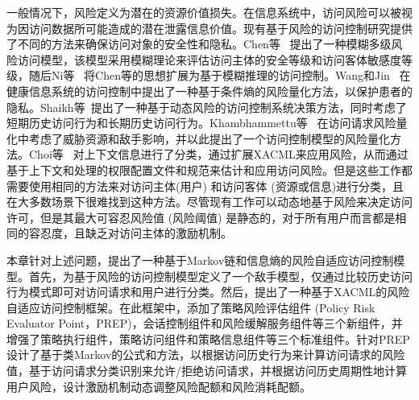 一般情况下，风险定义为潜在的资源价值损失。在信息系统中，访问风险可以被视为因访问数据所可能造成的潜在泄露信息价值。现有基于风险的访问控制研究提供了不同的方法来确保访问对象的安全性和隐私。Chen等~\cite{cheng2007fuzzy} 提出了一种模糊多级风险访问模型，该模型采用模糊理论来评估访问主体的安全等级和访问客体敏感度等级，随后Ni等~\cite{ni2010risk} 将Chen等的思想扩展为基于模糊推理的访问控制。Wang和Jin~\cite{wang2011quantified} 在健康信息系统的访问控制中提出了一种基于条件熵的风险量化方法，以保护患者的隐私。Shaikh等~\cite{shaikh2012dynamic}提出了一种基于动态风险的访问控制系统决策方法，同时考虑了短期历史访问行为和长期历史访问行为。Khambhammettu等~\cite{khambhammettu2013framework} 在访问请求风险量化中考虑了威胁资源和敌手影响，并以此提出了一个访问控制模型的风险量化方法。Choi等~\cite{choi2015framework} 对上下文信息进行了分类，通过扩展XACML来应用风险，从而通过基于上下文和处理的权限配置文件和规范来估计和应用访问风险。但是这些工作都需要使用相同的方法来对访问主体(用户) 和访问客体 (资源或信息)进行分类，且在大多数场景下很难找到这种方法。尽管现有工作可以动态地基于风险来决定访问许可，但是其最大可容忍风险值 (风险阈值) 是静态的，对于所有用户而言都是相同的容忍度，且缺乏对访问主体的激励机制。

本章针对上述问题，提出了一种基于Markov链和信息熵的风险自适应访问控制模型。首先，为基于风险的访问控制模型定义了一个敌手模型，仅通过比较历史访问行为模式即可对访问请求和用户进行分类。然后，提出了一种基于XACML的风险自适应访问控制框架。在此框架中，添加了策略风险评估组件 (Policy Risk Evaluator Point，PREP)，会话控制组件和风险缓解服务组件等三个新组件，并增强了策略执行组件，策略访问组件和策略信息组件等三个标准组件。针对PREP设计了基于类Markov的公式和方法，以根据访问历史行为来计算访问请求的风险值，基于访问请求分类识别来允许/拒绝访问请求，并根据访问历史周期性地计算用户风险，设计激励机制动态调整风险配额和风险消耗配额。

